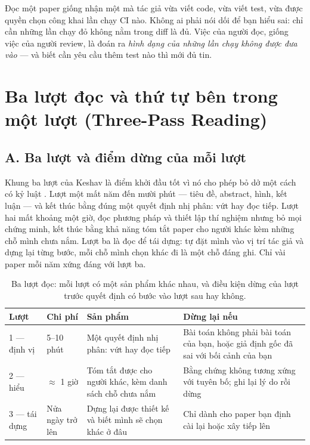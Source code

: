 \documentclass[../../deep_learning.tex]{subfiles}
\begin{document}
\begin{trucgiac}
Đọc một paper giống nhận một  mà tác giả vừa viết code, vừa viết test, vừa được quyền chọn công khai lần chạy CI nào. Không ai phải nói dối để bạn hiểu sai: chỉ cần những lần chạy đỏ không nằm trong diff là đủ. Việc của người đọc, giống việc của người review, là đoán ra \emph{hình dạng của những lần chạy không được đưa vào} — và biết cần yêu cầu thêm test nào thì mới đủ tin.
\end{trucgiac}

\section{Ba lượt đọc và thứ tự bên trong một lượt (Three-Pass Reading)}
\subsection{A. Ba lượt và điểm dừng của mỗi lượt}
Khung ba lượt của Keshav là điểm khởi đầu tốt vì nó cho phép bỏ dở một cách có kỷ luật \cite{keshav2007paper}. Lượt một mất năm đến mười phút — tiêu đề, abstract, hình, kết luận — và kết thúc bằng đúng một quyết định nhị phân: vứt hay đọc tiếp. Lượt hai mất khoảng một giờ, đọc phương pháp và thiết lập thí nghiệm nhưng bỏ mọi chứng minh, kết thúc bằng khả năng tóm tắt paper cho người khác kèm những chỗ mình chưa nắm. Lượt ba là đọc để tái dựng: tự đặt mình vào vị trí tác giả và dựng lại từng bước, mỗi chỗ mình chọn khác đi là một chỗ đáng ghi. Chỉ vài paper mỗi năm xứng đáng với lượt ba.

\begin{table}[H]\centering\footnotesize
\caption{Ba lượt đọc: mỗi lượt có một sản phẩm khác nhau, và điều kiện dừng của lượt trước quyết định có bước vào lượt sau hay không.}
\label{tab:ba-luot}
\begin{tabularx}{\linewidth}{@{}L{1.9cm}L{1.9cm}YY@{}}
\toprule
\textbf{Lượt} & \textbf{Chi phí} & \textbf{Sản phẩm} & \textbf{Dừng lại nếu}\\
 --- định vị & 5--10 phút & Một quyết định nhị phân: vứt hay đọc tiếp & Bài toán không phải bài toán của bạn, hoặc giả định gốc đã sai với bối cảnh của bạn\\
2 --- hiểu & \(\approx\) 1 giờ & Tóm tắt được cho người khác, kèm danh sách chỗ chưa nắm & Bằng chứng không tương xứng với tuyên bố; ghi lại lý do rồi dừng\\
3 --- tái dựng & Nửa ngày trở lên & Dựng lại được thiết kế và biết mình sẽ chọn khác ở đâu & Chỉ dành cho paper bạn định cài lại hoặc xây tiếp lên\\
\bottomrule
\end{tabularx}
\end{table}
\end{document}
